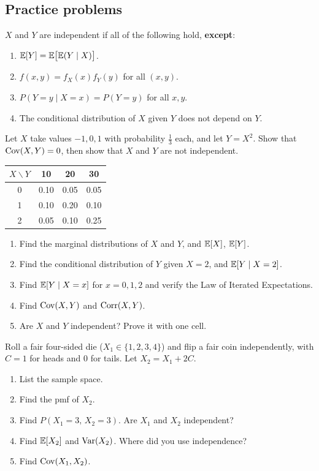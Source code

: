 \documentclass[11pt]{article}
\begin{document}
\subsection{Practice problems}
\setcounter{prob}{0}

$X$ and $Y$ are independent if all of the following hold, \textbf{except}:
\begin{enumerate}[label=(\alph*)]
  \item $\mathbb{E}[Y]=\mathbb{E}\big[\mathbb{E}(Y\mid X)\big]$.
  \item $f(x,y)=f_X(x)f_Y(y)$ for all $(x,y)$.
  \item $P(Y=y\mid X=x)=P(Y=y)$ for all $x,y$.
  \item The conditional distribution of $X$ given $Y$ does not depend on $Y$.
\end{enumerate}

Let $X$ take values $-1,0,1$ with probability $\tfrac13$ each, and let $Y=X^2$. Show that $\operatorname{Cov}(X,Y)=0$, then show that $X$ and $Y$ are not independent.

\begin{center}
\begin{tabular}{c|ccc}
$X \backslash Y$ & 10 & 20 & 30 \\ \hline
0 & 0.10 & 0.05 & 0.05 \\
1 & 0.10 & 0.20 & 0.10 \\
2 & 0.05 & 0.10 & 0.25
\end{tabular}
\end{center}
\begin{enumerate}[label=(\alph*)]
  \item Find the marginal distributions of $X$ and $Y$, and $\mathbb{E}[X]$, $\mathbb{E}[Y]$.
  \item Find the conditional distribution of $Y$ given $X=2$, and $\mathbb{E}[Y\mid X=2]$.
  \item Find $\mathbb{E}[Y\mid X=x]$ for $x=0,1,2$ and verify the Law of Iterated Expectations.
  \item Find $\operatorname{Cov}(X,Y)$ and $\operatorname{Corr}(X,Y)$.
  \item Are $X$ and $Y$ independent? Prove it with one cell.
\end{enumerate}

Roll a fair four-sided die ($X_1\in\{1,2,3,4\}$) and flip a fair coin independently, with $C=1$ for heads and $0$ for tails. Let $X_2=X_1+2C$.
\begin{enumerate}[label=(\alph*)]
  \item List the sample space.
  \item Find the pmf of $X_2$.
  \item Find $P(X_1=3,\,X_2=3)$. Are $X_1$ and $X_2$ independent?
  \item Find $\mathbb{E}[X_2]$ and $\operatorname{Var}(X_2)$. Where did you use independence?
  \item Find $\operatorname{Cov}(X_1,X_2)$.
\end{enumerate}
\end{document}
